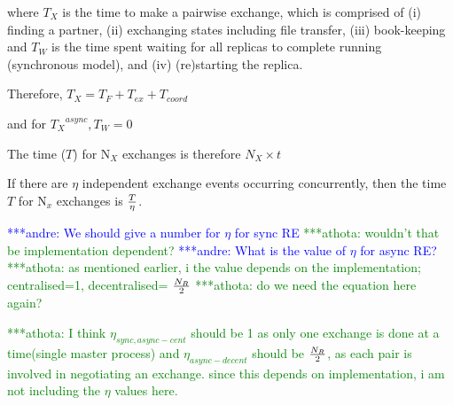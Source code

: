 \documentclass{rspublic}
\newcommand{\alnote}[1]{ {\textcolor{blue} { ***andre: #1 }}}
\newcommand{\athotanote}[1]{ {\textcolor{green} { ***athota: #1 }}}
\newcommand{\alnote}[1]{}
\newcommand{\athotanote}[1]{}
\begin{document}
where $T_{X}$ is the time to make a pairwise exchange, which is comprised of (i) finding a partner, (ii) exchanging
states including file transfer, (iii) book-keeping and $T_{W}$ is the time spent waiting for all replicas to complete running (synchronous model), and (iv) (re)starting the replica.

Therefore, ${T_{X}} = {T_F + T_{ex} + T_{coord}}$ 

and for ${T_{X}}^{async}, T_W = 0$

The time ($T$) for N$_{X}$ exchanges is therefore $N_{X} \times t$

If there are $\eta$ independent exchange events occurring concurrently, then the time $T$ for 
N$_x$ exchanges is $T \over \eta$.

\alnote{We should give a number for $\eta$ for sync
  RE}\athotanote{wouldn't that be implementation dependent?}
\alnote{What is the value of $\eta$ for async RE?} \athotanote{as
  mentioned earlier, i the value depends on the implementation;
  centralised=1, decentralised= $N_R\over2$} \athotanote{do we need
  the equation here again?}














\athotanote{I think $\eta_{sync,async-cent}$ should be 1 as only one exchange is done at a time(single master process) and $\eta_{async-decent}$ should be $N_R \over 2$, as each pair is involved in negotiating an exchange. since this depends on implementation, i am not including the $\eta$ values here.}
\end{document}
